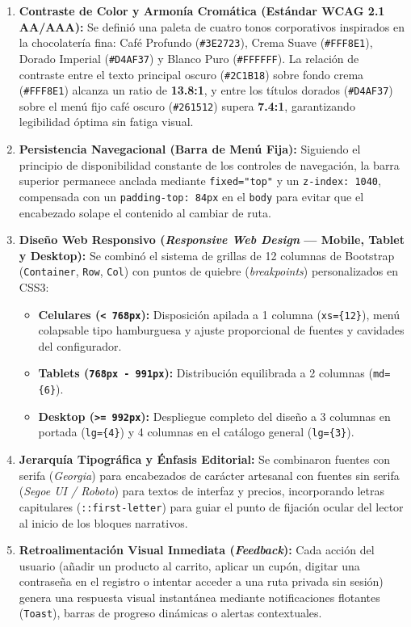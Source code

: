 \documentclass[12pt,letterpaper]{article}
\begin{document}
\begin{enumerate}[leftmargin=1.2cm]
  \item \textbf{Contraste de Color y Armonía Cromática (Estándar WCAG 2.1 AA/AAA):}
    Se definió una paleta de cuatro tonos corporativos inspirados en la chocolatería fina: Café Profundo (\texttt{\#3E2723}), Crema Suave (\texttt{\#FFF8E1}), Dorado Imperial (\texttt{\#D4AF37}) y Blanco Puro (\texttt{\#FFFFFF}). La relación de contraste entre el texto principal oscuro (\texttt{\#2C1B18}) sobre fondo crema (\texttt{\#FFF8E1}) alcanza un ratio de \textbf{13.8:1}, y entre los títulos dorados (\texttt{\#D4AF37}) sobre el menú fijo café oscuro (\texttt{\#261512}) supera \textbf{7.4:1}, garantizando legibilidad óptima sin fatiga visual.
  \item \textbf{Persistencia Navegacional (Barra de Menú Fija):}
    Siguiendo el principio de disponibilidad constante de los controles de navegación, la barra superior permanece anclada mediante \texttt{fixed="top"} y un \texttt{z-index: 1040}, compensada con un \texttt{padding-top: 84px} en el \texttt{body} para evitar que el encabezado solape el contenido al cambiar de ruta.
  \item \textbf{Diseño Web Responsivo (\textit{Responsive Web Design} — Mobile, Tablet y Desktop):}
    Se combinó el sistema de grillas de 12 columnas de Bootstrap (\texttt{Container}, \texttt{Row}, \texttt{Col}) con puntos de quiebre (\textit{breakpoints}) personalizados en CSS3:
    \begin{itemize}
      \item \textbf{Celulares (\texttt{< 768px}):} Disposición apilada a 1 columna (\texttt{xs=\{12\}}), menú colapsable tipo hamburguesa y ajuste proporcional de fuentes y cavidades del configurador.
      \item \textbf{Tablets (\texttt{768px - 991px}):} Distribución equilibrada a 2 columnas (\texttt{md=\{6\}}).
      \item \textbf{Desktop (\texttt{>= 992px}):} Despliegue completo del diseño a 3 columnas en portada (\texttt{lg=\{4\}}) y 4 columnas en el catálogo general (\texttt{lg=\{3\}}).
    \end{itemize}
  \item \textbf{Jerarquía Tipográfica y Énfasis Editorial:}
    Se combinaron fuentes con serifa (\textit{Georgia}) para encabezados de carácter artesanal con fuentes sin serifa (\textit{Segoe UI / Roboto}) para textos de interfaz y precios, incorporando letras capitulares (\texttt{::first-letter}) para guiar el punto de fijación ocular del lector al inicio de los bloques narrativos.
  \item \textbf{Retroalimentación Visual Inmediata (\textit{Feedback}):}
    Cada acción del usuario (añadir un producto al carrito, aplicar un cupón, digitar una contraseña en el registro o intentar acceder a una ruta privada sin sesión) genera una respuesta visual instantánea mediante notificaciones flotantes (\texttt{Toast}), barras de progreso dinámicas o alertas contextuales.
\end{enumerate}
\end{document}
